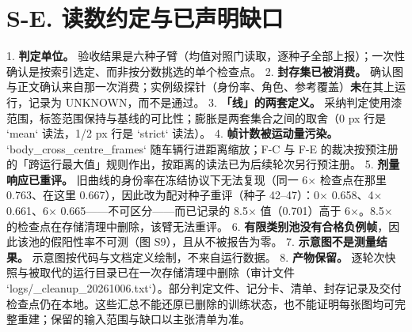 \documentclass[journal]{IEEEtran}
\begin{document}
\section*{S-E. 读数约定与已声明缺口}
1. \textbf{判定单位。} 验收结果是六种子臂（均值对照门读取，逐种子全部上报）；一次性确认是按索引选定、而非按分数挑选的单个检查点。
2. \textbf{封存集已被消费。} 确认图与正文确认来自那一次消费；实例级探针（身份率、角色、参考覆盖）\textbf{未}在其上运行，记录为 UNKNOWN，而不是通过。
3. \textbf{「线」的两套定义。} 采纳判定使用漆范围，标签范围保持与基线的可比性；膨胀是两套集合之间的取舍（0 px 行是 `mean` 读法，1/2 px 行是 `strict` 读法）。
4. \textbf{帧计数被运动量污染。} `body_cross_centre_frames` 随车辆行进距离缩放；F-C 与 F-E 的裁决按预注册的「跨运行最大值」规则作出，按距离的读法已为后续轮次另行预注册。
5. \textbf{剂量响应已重评。} 旧曲线的身份率在冻结协议下无法复现（同一 6$\times$ 检查点在那里 0.763、在这里 0.667），因此改为配对种子重评（种子 42--47）：0$\times$ 0.658、4$\times$ 0.661、6$\times$ 0.665------不可区分------而已记录的 8.5$\times$ 值（0.701）高于 6$\times$。8.5$\times$ 的检查点在存储清理中删除，该臂无法重评。
6. \textbf{有限类别池没有合格负例帧}，因此该池的假阳性率不可测（图 S9），且从不被报告为零。
7. \textbf{示意图不是测量结果。} 示意图按代码与文档定义绘制，不来自运行数据。
8. \textbf{产物保留。} 逐轮次快照与被取代的运行目录已在一次存储清理中删除（审计文件 `logs/_cleanup_20261006.txt`）。部分判定文件、记分卡、清单、封存记录及交付检查点仍在本地。这些汇总不能还原已删除的训练状态，也不能证明每张图均可完整重建；保留的输入范围与缺口以主张清单为准。
\end{document}
